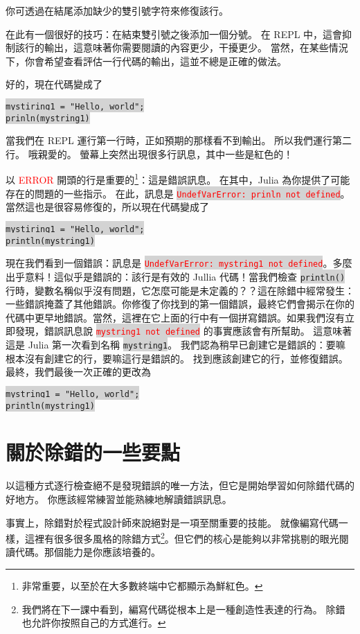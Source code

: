 \documentclass[]{article}
\newcommand{\codequote}[1]{\colorbox{lightgray}{\tt #1}}
\begin{document}
你可透過在結尾添加缺少的雙引號字符來修復該行。

在此有一個很好的技巧：在結束雙引號之後添加一個分號。 在 REPL 中，這會抑制該行的輸出，這意味著你需要閱讀的內容更少，干擾更少。 當然，在某些情況下，你會希望查看評估一行代碼的輸出，這並不總是正確的做法。

好的，現在代碼變成了

\codequote{mystiring1 = "Hello, world";}\\
\codequote{prinln(mystring1)}

當我們在 REPL 運行第一行時，正如預期的那樣看不到輸出。 所以我們運行第二行。 哦親愛的。 螢幕上突然出現很多行訊息，其中一些是紅色的！

以 \textcolor{red}{ERROR} 開頭的行是重要的\footnote{非常重要，以至於在大多數終端中它都顯示為鮮紅色。}：這是錯誤訊息。 在其中，Julia 為你提供了可能存在的問題的一些指示。 在此，訊息是 \codequote{\textcolor{red}{UndefVarError: prinln not defined}}。 當然這也是很容易修復的，所以現在代碼變成了

\codequote{mystiring1 = "Hello, world";}\\
\codequote{println(mystring1)}

現在我們看到一個錯誤：訊息是 \codequote{\textcolor{red}{UndefVarError: mystring1 not defined}}。多麼出乎意料！這似乎是錯誤的：該行是有效的 Jullia 代碼！當我們檢查 \codequote{println()} 行時，變數名稱似乎沒有問題，它怎麼可能是未定義的？？這在除錯中經常發生：一些錯誤掩蓋了其他錯誤。你修復了你找到的第一個錯誤，最終它們會揭示在你的代碼中更早地錯誤。當然，這裡在它上面的行中有一個拼寫錯誤。如果我們沒有立即發現，錯誤訊息說 \codequote{\textcolor{red}{mystring1 not defined}} 的事實應該會有所幫助。 這意味著這是 Julia 第一次看到名稱 \codequote{mystring1}。 我們認為稍早已創建它是錯誤的：要嘛根本沒有創建它的行，要嘛這行是錯誤的。 找到應該創建它的行，並修復錯誤。 最終，我們最後一次正確的更改為

\codequote{mystring1 = "Hello, world";}\\
\codequote{println(mystring1)}

\section*{關於除錯的一些要點}

以這種方式逐行檢查絕不是發現錯誤的唯一方法，但它是開始學習如何除錯代碼的好地方。 你應該經常練習並能熟練地解讀錯誤訊息。

事實上，除錯對於程式設計師來說絕對是一項至關重要的技能。 就像編寫代碼一樣，這裡有很多很多風格的除錯方式\footnote{我們將在下一課中看到，編寫代碼從根本上是一種創造性表達的行為。 除錯也允許你按照自己的方式進行。}。但它們的核心是能夠以非常挑剔的眼光閱讀代碼。那個能力是你應該培養的。
\end{document}

